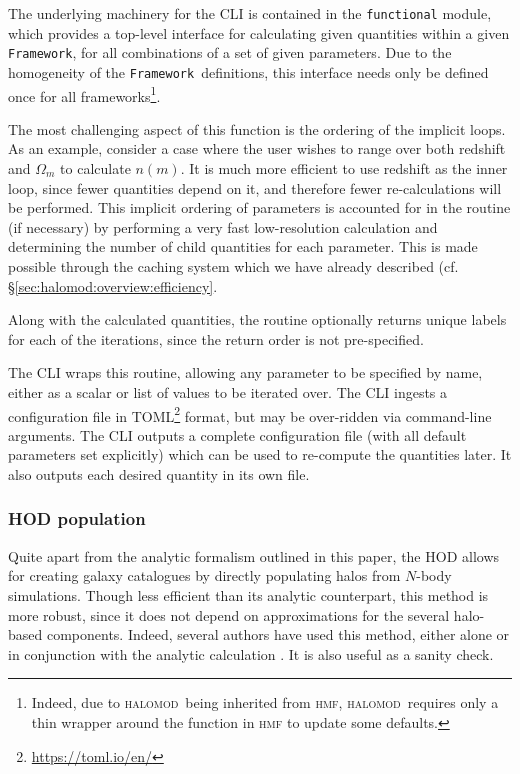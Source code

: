 \documentclass[5p,aas_macros]{elsarticle}
\newcommand{\halomod}{\textsc{halomod}}
\newcommand{\framework}{\texttt{Framework}}
\begin{document}
The underlying machinery for the CLI is contained in the \verb|functional| module, which provides a top-level interface for calculating given quantities within a given \framework, for all combinations of a set of given parameters. Due to the homogeneity of the \framework\ definitions, this interface needs only be defined once for all frameworks\footnote{Indeed, due to \halomod\  being inherited from \textsc{hmf}, \halomod\  requires only a thin wrapper around the function in \textsc{hmf} to update some defaults.}. 

The most challenging aspect of this function is the ordering of the implicit loops. As an example, consider a case where the user wishes to range over both redshift and $\Omega_m$ to calculate $n(m)$. It is much more efficient to use redshift as the inner loop, since fewer quantities depend on it, and therefore fewer re-calculations will be performed. This implicit ordering of parameters is accounted for in the routine (if necessary) by performing a very fast low-resolution calculation and determining the number of child quantities for each parameter. This is made possible through the caching system which we have already described (cf. \S\ref{sec:halomod:overview:efficiency}.

Along with the calculated quantities, the routine optionally returns unique labels for each of the iterations, since the return order is not pre-specified.

The CLI wraps this routine, allowing any parameter to be specified by name, either as a scalar or list of values to be iterated over. The CLI ingests a configuration file in \textsc{TOML}\footnote{\url{https://toml.io/en/}} format, but may be over-ridden via command-line arguments. The CLI outputs a complete configuration file (with all default parameters set explicitly) which can be used to re-compute the quantities later. It also outputs each desired quantity in its own file. 


\subsubsection{HOD population}
\label{sec:halomod:extra:pophod}
Quite apart from the analytic formalism outlined in this paper, the HOD allows for creating galaxy catalogues by directly populating halos from $N$-body simulations. Though less efficient than its analytic counterpart, this method is more robust, since it does not depend on approximations for the several halo-based components. Indeed, several authors have used this method, either alone or in conjunction with the analytic calculation \citep{Skibba2015,Zheng2015}. It is also useful as a sanity check.
\end{document}
